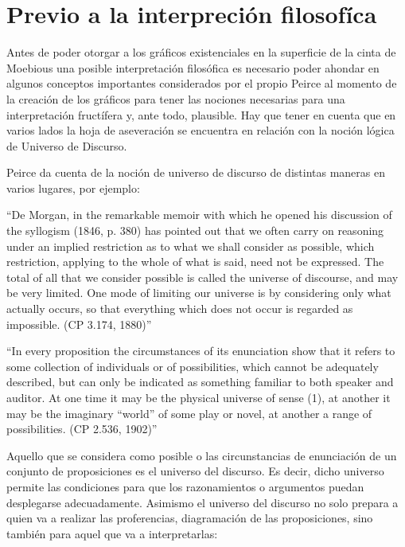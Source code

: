 \documentclass[
	fontsize=10pt, %
	twoside=true, %
	secnumdepth=1, %
	abstract=true, %
]{kaohandt}
\begin{document}

\section{Previo a la interpreción filosofíca} %
\label{sec:Previo a la interpreción filosofíca}

Antes de poder otorgar a los gráficos existenciales en la superficie de la cinta de Moebious una posible interpretación filosófica es necesario poder ahondar en algunos conceptos importantes considerados por el propio Peirce al momento de la creación de los gráficos para tener las nociones necesarias para una interpretación fructífera y, ante todo, plausible. Hay que tener en cuenta que en varios lados la hoja de aseveración se encuentra en relación con la noción lógica de Universo de Discurso.

Peirce da cuenta de la noción de universo de discurso de distintas maneras en varios lugares, por ejemplo:

\enquote{De Morgan, in the remarkable memoir with which he opened his discussion of the syllogism (1846, p. 380) has pointed out that we often carry on reasoning under an implied restriction as to what we shall consider as possible, which restriction, applying to the whole of what is said, need not be expressed. The total of all that we consider possible is called the universe of discourse, and may be very limited. One mode of limiting our universe is by considering only what actually occurs, so that everything which does not occur is regarded as impossible. (CP 3.174, 1880)}

\enquote{In every proposition the circumstances of its enunciation show that it refers to some collection of individuals or of possibilities, which cannot be adequately described, but can only be indicated as something familiar to both speaker and auditor. At one time it may be the physical universe of sense (1), at another it may be the imaginary “world” of some play or novel, at another a range of possibilities. (CP 2.536, 1902)}

Aquello que se considera como posible o las circunstancias de enunciación de un conjunto de proposiciones es el universo del discurso. Es decir, dicho universo permite las condiciones para que los razonamientos o argumentos puedan desplegarse adecuadamente. Asimismo el universo del discurso no solo prepara a quien va a realizar las proferencias, diagramación de las proposiciones, sino también para aquel que va a interpretarlas:
\end{document}
